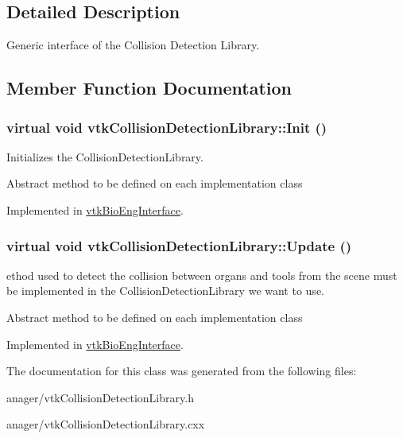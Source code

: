 \subsection{Detailed Description}
Generic interface of the Collision Detection Library. 

\subsection{Member Function Documentation}
\hypertarget{classvtkCollisionDetectionLibrary_ac29256d189958f001608f8f5d170a73c}{
\subsubsection[{Init}]{\setlength{\rightskip}{0pt plus 5cm}virtual void vtkCollisionDetectionLibrary::Init ()}}
\label{classvtkCollisionDetectionLibrary_ac29256d189958f001608f8f5d170a73c}


Initializes the CollisionDetectionLibrary. 

Abstract method to be defined on each implementation class 

Implemented in \hyperlink{classvtkBioEngInterface_a52f71a20ab8e16bbeb357642975a5b67}{vtkBioEngInterface}.

\hypertarget{classvtkCollisionDetectionLibrary_ae3ce4d5055eee783a8bf9f06f62f5667}{
\subsubsection[{Update}]{\setlength{\rightskip}{0pt plus 5cm}virtual void vtkCollisionDetectionLibrary::Update ()}}
\label{classvtkCollisionDetectionLibrary_ae3ce4d5055eee783a8bf9f06f62f5667}


ethod used to detect the collision between organs and tools from the scene must be implemented in the CollisionDetectionLibrary we want to use. 

Abstract method to be defined on each implementation class 

Implemented in \hyperlink{classvtkBioEngInterface_af04a067b7a6f524faa7ff14552147260}{vtkBioEngInterface}.



The documentation for this class was generated from the following files:\begin{DoxyCompactItemize}
\item 
anager/vtkCollisionDetectionLibrary.h\item 
anager/vtkCollisionDetectionLibrary.cxx\end{DoxyCompactItemize}
